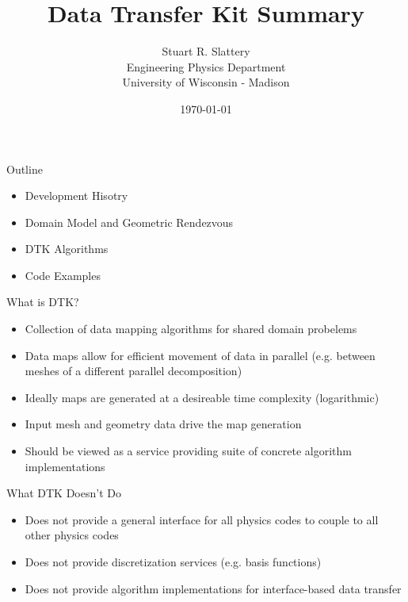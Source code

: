 \documentclass{beamer}
\author{Stuart R. Slattery
  \\ Engineering Physics Department
  \\ University of Wisconsin - Madison
}
\date{\today}
\title{Data Transfer Kit Summary}
\begin{document}
\maketitle

\begin{frame}{Outline}

  \begin{itemize}
  \item Development Hisotry
    \medskip
  \item Domain Model and Geometric Rendezvous
    \medskip
  \item DTK Algorithms
    \medskip
  \item Code Examples
  \end{itemize}

\end{frame}

\begin{frame}{What is DTK?}

  \begin{itemize}
  \item Collection of data mapping algorithms for shared domain probelems
    \medskip
  \item Data maps allow for efficient movement of data in parallel
    (e.g. between meshes of a different parallel decomposition)
    \medskip
  \item Ideally maps are generated at a desireable time complexity
    (logarithmic)
    \medskip
  \item Input mesh and geometry data drive the map generation
    \medskip
  \item Should be viewed as a service providing suite of concrete
    algorithm implementations
  \end{itemize}
 
\end{frame}

\begin{frame}{What DTK Doesn't Do}

  \begin{itemize}
  \item Does not provide a general interface for all physics codes to
    couple to all other physics codes
    \medskip
  \item Does not provide discretization services (e.g. basis functions)
    \medskip
  \item Does not provide algorithm implementations for interface-based
    data transfer
  \end{itemize}

\end{frame}
\end{document}
